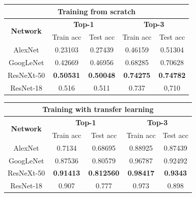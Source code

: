 \documentclass{article}
\begin{document}

\begin{table}[]
	\begin{tabular}{|c|c|c|c|c|}
		\hline
		\multicolumn{5}{|c|}{\textbf{Training from scratch}}                                                          \\ \hline
		\multirow{2}{*}{\textbf{Network}} & \multicolumn{2}{c|}{\textbf{Top-1}} & \multicolumn{2}{c|}{\textbf{Top-3}} \\ \cline{2-5} 
		& Train acc        & Test acc         & Train acc        & Test acc         \\ \hline
		AlexNet                           & 0.23103          & 0.27439          & 0.46159          & 0.51304          \\ \hline
		GoogLeNet                         & 0.42669          & 0.46956          & 0.68285          & 0.70628          \\ \hline
		ResNeXt-50                        & \textbf{0.50531} & \textbf{0.50048} & \textbf{0.74275} & \textbf{0.74782} \\ \hline
		ResNet-18 \cite{ArtistIdCNN406}                    & 0.516            & 0.511            & 0.737            & 0,710            \\ \hline
	\end{tabular}
	\begin{tabular}{|c|c|c|c|c|}
		\hline
		\multicolumn{5}{|c|}{\textbf{Training with transfer learning}}                                                           \\ \hline
		\multirow{2}{*}{\textbf{Network}} & \multicolumn{2}{c|}{\textbf{Top-1}}  & \multicolumn{2}{c|}{\textbf{Top-3}} \\ \cline{2-5} 
		& Train acc        & Test acc          & Train acc         & Test acc        \\ \hline
		AlexNet                           & 0.7134           & 0.68695           & 0.88925           & 0.87439         \\ \hline
		GoogLeNet                         & 0.87536          & 0.80579           & 0.96787           & 0.92492         \\ \hline
		ResNeXt-50                        & \textbf{0.91413} & \textbf{0.812560} & \textbf{0.98417}  & \textbf{0.9343} \\ \hline
		ResNet-18 \cite{ArtistIdCNN406}                    & 0.907            & 0.777             & 0.973             & 0.898           \\ \hline
	\end{tabular}
\end{table}
\end{document}
